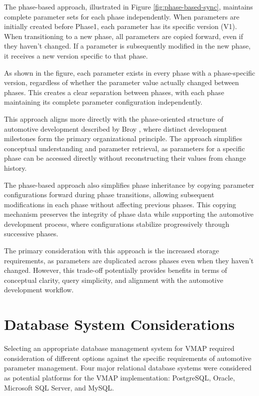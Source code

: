 The phase-based approach, illustrated in Figure \ref{fig:phase-based-sync}, maintains complete parameter sets for each phase independently. When parameters are initially created before Phase1, each parameter has its specific version (V1). When transitioning to a new phase, all parameters are copied forward, even if they haven't changed. If a parameter is subsequently modified in the new phase, it receives a new version specific to that phase.

As shown in the figure, each parameter exists in every phase with a phase-specific version, regardless of whether the parameter value actually changed between phases. This creates a clear separation between phases, with each phase maintaining its complete parameter configuration independently.

This approach aligns more directly with the phase-oriented structure of automotive development described by Broy \cite{broy2006challenges}, where distinct development milestones form the primary organizational principle. The approach simplifies conceptual understanding and parameter retrieval, as parameters for a specific phase can be accessed directly without reconstructing their values from change history.

The phase-based approach also simplifies phase inheritance by copying parameter configurations forward during phase transitions, allowing subsequent modifications in each phase without affecting previous phases. This copying mechanism preserves the integrity of phase data while supporting the automotive development process, where configurations stabilize progressively through successive phases.

The primary consideration with this approach is the increased storage requirements, as parameters are duplicated across phases even when they haven't changed. However, this trade-off potentially provides benefits in terms of conceptual clarity, query simplicity, and alignment with the automotive development workflow.

\section{Database System Considerations}
\label{sec:database-system-considerations}

Selecting an appropriate database management system for \ac{VMAP} required consideration of different options against the specific requirements of automotive parameter management. Four major relational database systems were considered as potential platforms for the \ac{VMAP} implementation: PostgreSQL, Oracle, Microsoft SQL Server, and MySQL.

